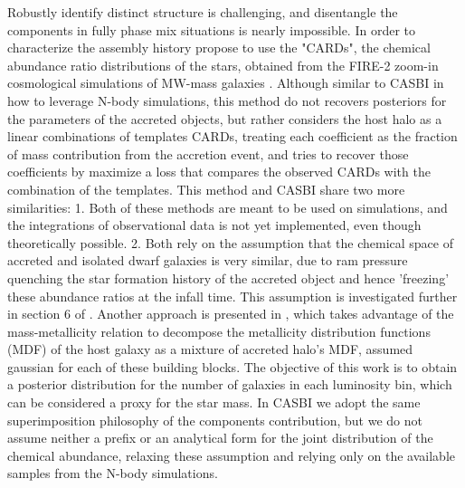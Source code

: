 Robustly identify distinct structure is challenging, and disentangle the components in fully phase mix situations is nearly impossible. In order to characterize the assembly history \cite{cunninghamReadingCARDsImprint2022}
propose to use the "CARDs", the chemical abundance ratio distributions of the stars, obtained from the FIRE-2 zoom-in cosmological simulations of MW-mass galaxies \cite{wetzelRECONCILINGDWARFGALAXIES2016}.
Although similar to CASBI in how to leverage N-body simulations, this method do not recovers posteriors for the parameters of the accreted objects, but rather considers the host halo as a linear combinations of templates CARDs, treating each coefficient as the fraction of mass contribution from the accretion event, and tries to recover those coefficients by maximize a loss that compares the observed CARDs with the combination of the templates. This method and CASBI share two more similarities: 1. Both of these methods are meant to be used on simulations, and the integrations of observational data is not yet implemented, even though theoretically possible. 2. Both rely on the assumption that the chemical space of accreted and isolated dwarf galaxies is very similar, due to ram pressure quenching the star formation history of the accreted object and hence 'freezing' these abundance ratios at the infall time. This assumption is investigated further in section 6 of \cite{cunninghamReadingCARDsImprint2022}. 
Another approach is presented in \cite{deasonUnravellingMassSpectrum2023}, which takes advantage of the mass-metallicity relation to decompose the metallicity distribution functions (MDF) of the host galaxy as a mixture of accreted halo's MDF, assumed gaussian for each of these building blocks. The objective of this work is to obtain a posterior distribution for the number of galaxies in each luminosity bin, which can be considered a proxy for the star mass. In CASBI we adopt the same superimposition philosophy of the components contribution, but we do not assume neither a prefix or an analytical form for the joint distribution of the chemical abundance, relaxing these assumption and relying only on the available samples from the N-body simulations.  